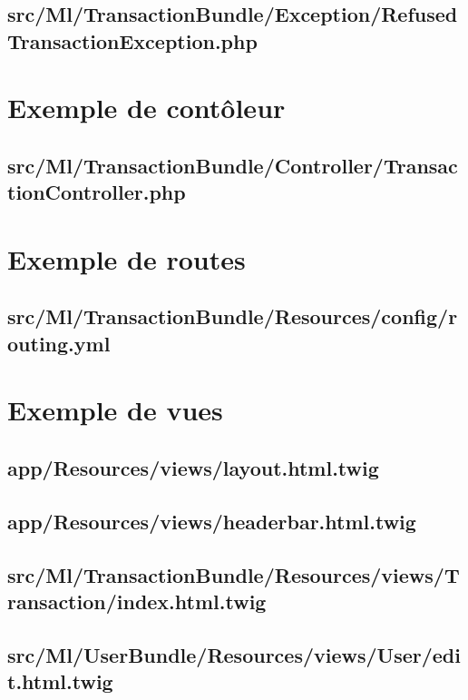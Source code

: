 \subsection{src/Ml/TransactionBundle/Exception/RefusedTransactionException.php}


\section{Exemple de contôleur}

\subsection{src/Ml/TransactionBundle/Controller/TransactionController.php}


\section{Exemple de routes}
\subsection{src/Ml/TransactionBundle/Resources/config/routing.yml}


\section{Exemple de vues}

\subsection{app/Resources/views/layout.html.twig}

\subsection{app/Resources/views/headerbar.html.twig}

\subsection{src/Ml/TransactionBundle/Resources/views/Transaction/index.html.twig}

\subsection{src/Ml/UserBundle/Resources/views/User/edit.html.twig}


